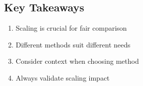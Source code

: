 \documentclass[11pt]{article}
\providecommand{\tightlist}{%
  \setlength{\itemsep}{0pt}\setlength{\parskip}{0pt}}
\begin{document}
\subsection{Key Takeaways}\label{key-takeaways}

\begin{enumerate}
\def\labelenumi{\arabic{enumi}.}
\tightlist
\item
  Scaling is crucial for fair comparison
\item
  Different methods suit different needs
\item
  Consider context when choosing method
\item
  Always validate scaling impact
\end{enumerate}
\end{document}
